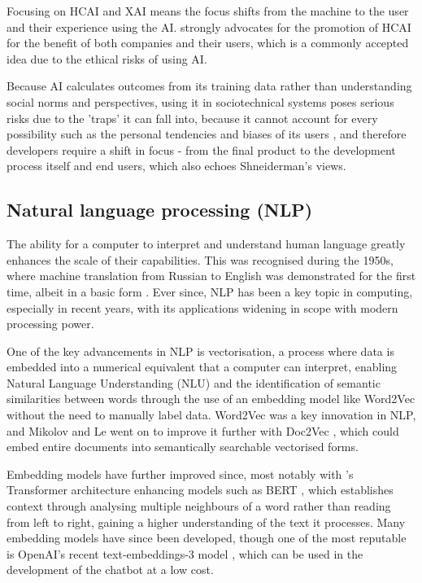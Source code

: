 Focusing on HCAI and XAI means the focus shifts from the machine to the user and their experience 
using the AI. \textcite{AIEthics} strongly advocates for the 
promotion of HCAI for the benefit of both companies and their users, which is a commonly accepted 
idea due to the ethical risks of using AI. 

Because AI calculates outcomes from its training data rather 
than understanding social norms and perspectives, using it in sociotechnical systems poses serious risks 
due to the 'traps' it can fall into, because it cannot account for every possibility such as the personal tendencies 
and biases of its users \autocite{selbst_fairness_2019}, and therefore developers require a shift in focus - from the final product
to the development process itself and end users, which also echoes Shneiderman's views. 

\subsection{Natural language processing (NLP)}\label{sec:LitReviewNLP}
The ability for a computer to interpret and understand human language greatly enhances the scale of their capabilities. This was 
recognised during the 1950s, where machine translation from Russian to English was demonstrated for the first time, albeit in a basic form \autocite{zampolli_natural_1994}.
Ever since, NLP has been a key topic in computing, especially in recent years, with its applications widening 
in scope with modern processing power.

One of the key advancements in NLP is vectorisation, a process where data is embedded into a numerical equivalent that a computer can interpret, 
enabling Natural Language Understanding (NLU) and the identification of semantic similarities between words through the use of an embedding model 
like Word2Vec \autocite{mikolov_efficient_2013} without the need to manually label data. 
Word2Vec was a key innovation in NLP, and Mikolov and Le went on to improve it further with Doc2Vec \autocite{le_distributed_2014}, which could embed 
entire documents into semantically searchable vectorised forms.

Embedding models have further improved since, most notably with \textcite{vaswani_attention_2017}'s Transformer architecture enhancing models such as 
BERT \autocite{devlin_bert_2019}, which establishes context through analysing multiple neighbours of a word rather than reading from left to right,
gaining a higher understanding of the text it processes. Many embedding models have since been developed, though one of the most reputable is OpenAI's 
recent text-embeddings-3 model \autocite{openai_vector_nodate}, which can be used in the development of the chatbot at a low cost. 

